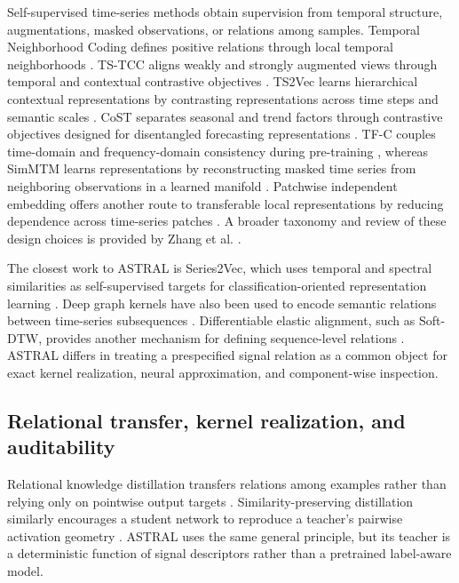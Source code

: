 \documentclass[pdflatex,sn-mathphys-num]{sn-jnl}
\newcommand{\1}{\mathbf{1}}
\theoremstyle{plain}
\begin{document}
	Self-supervised time-series methods obtain supervision from temporal structure, augmentations, masked observations, or relations among samples. Temporal Neighborhood Coding defines positive relations through local temporal neighborhoods \cite{tonekaboni2021tnc}. TS-TCC aligns weakly and strongly augmented views through temporal and contextual contrastive objectives \cite{eldele2021tstcc}. TS2Vec learns hierarchical contextual representations by contrasting representations across time steps and semantic scales \cite{yue2022ts2vec}. CoST separates seasonal and trend factors through contrastive objectives designed for disentangled forecasting representations \cite{woo2022cost}. TF-C couples time-domain and frequency-domain consistency during pre-training \cite{zhang2022tfc}, whereas SimMTM learns representations by reconstructing masked time series from neighboring observations in a learned manifold \cite{dong2023simmtm}. Patchwise independent embedding offers another route to transferable local representations by reducing dependence across time-series patches \cite{lee2024patches}. A broader taxonomy and review of these design choices is provided by Zhang et al. \cite{zhang2024sslreview}.
	
	The closest work to ASTRAL is Series2Vec, which uses temporal and spectral similarities as self-supervised targets for classification-oriented representation learning \cite{foumani2024series2vec}. Deep graph kernels have also been used to encode semantic relations between time-series subsequences \cite{yu2024deepgraph}. Differentiable elastic alignment, such as Soft-DTW, provides another mechanism for defining sequence-level relations \cite{cuturi2017softdtw}. ASTRAL differs in treating a prespecified signal relation as a common object for exact kernel realization, neural approximation, and component-wise inspection.
	
	\subsection{Relational transfer, kernel realization, and auditability}
	
	Relational knowledge distillation transfers relations among examples rather than relying only on pointwise output targets \cite{park2019rkd}. Similarity-preserving distillation similarly encourages a student network to reproduce a teacher's pairwise activation geometry \cite{tung2019spkd}. ASTRAL uses the same general principle, but its teacher is a deterministic function of signal descriptors rather than a pretrained label-aware model.
	
\end{document}
